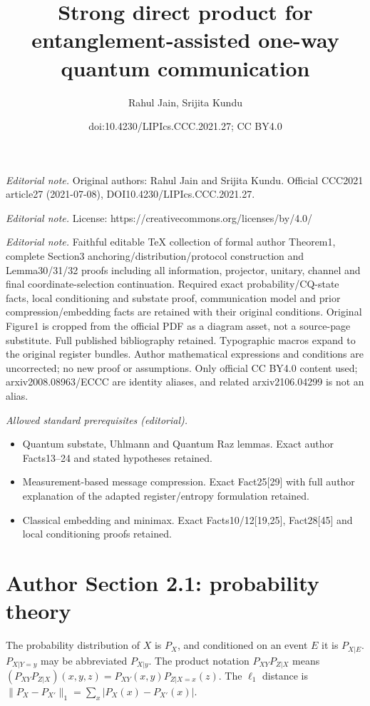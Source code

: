 \documentclass[10pt,a4paper]{article}
\title{Strong direct product for entanglement-assisted one-way quantum communication}
\author{Rahul Jain, Srijita Kundu}
\date{doi:10.4230/LIPIcs.CCC.2021.27; CC BY4.0}
\begin{document}
\maketitle
\noindent\textit{Editorial note.} Original authors: Rahul Jain and Srijita Kundu. Official CCC2021 article27 (2021-07-08), DOI10.4230/LIPIcs.CCC.2021.27.\par\medskip
\noindent\textit{Editorial note.} License: https://creativecommons.org/licenses/by/4.0/\par\medskip
\noindent\textit{Editorial note.} Faithful editable TeX collection of formal author Theorem1, complete Section3 anchoring/distribution/protocol construction and Lemma30/31/32 proofs including all information, projector, unitary, channel and final coordinate-selection continuation. Required exact probability/CQ-state facts, local conditioning and substate proof, communication model and prior compression/embedding facts are retained with their original conditions. Original Figure1 is cropped from the official PDF as a diagram asset, not a source-page substitute. Full published bibliography retained. Typographic macros expand to the original register bundles. Author mathematical expressions and conditions are uncorrected; no new proof or assumptions. Only official CC BY4.0 content used; arxiv2008.08963/ECCC are identity aliases, and related arxiv2106.04299 is not an alias.\par\medskip
\noindent\textit{Allowed standard prerequisites (editorial).}\begin{itemize}
\item Quantum substate, Uhlmann and Quantum Raz lemmas. Exact author Facts13--24 and stated hypotheses retained.
\item Measurement-based message compression. Exact Fact25[29] with full author explanation of the adapted register/entropy formulation retained.
\item Classical embedding and minimax. Exact Facts10/12[19,25], Fact28[45] and local conditioning proofs retained.
\end{itemize}\medskip
\section*{Author Section 2.1: probability theory}
The probability distribution of $X$ is $P_X$, and conditioned on an event $E$ it is $P_{X|E}$. $P_{X|Y=y}$ may be abbreviated $P_{X|y}$. The product notation $P_{XY}P_{Z|X}$ means $(P_{XY}P_{Z|X})(x,y,z)=P_{XY}(x,y)P_{Z|X=x}(z)$. The $\ell_1$ distance is $\|P_X-P_{X'}\|_1=\sum_x|P_X(x)-P_{X'}(x)|$.
\end{document}

